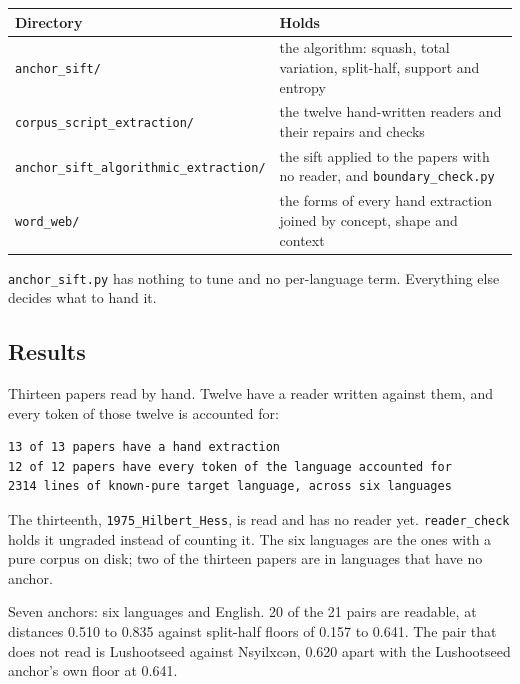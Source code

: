 \tiny
\setlength{\tabcolsep}{2pt}
\begin{longtable}{@{}>{\raggedright\arraybackslash}p{}>{\raggedright\arraybackslash}p{}@{}}
\toprule
Directory & Holds \\
\midrule
\texttt{anchor\_\allowbreak{}sift/\allowbreak{}} & the algorithm: squash, total variation, split-half, support and entropy \\
\texttt{corpus\_\allowbreak{}script\_\allowbreak{}extraction/\allowbreak{}} & the twelve hand-written readers and their repairs and checks \\
\texttt{anchor\_\allowbreak{}sift\_\allowbreak{}algorithmic\_\allowbreak{}extraction/\allowbreak{}} & the sift applied to the papers with no reader, and \texttt{boundary\_\allowbreak{}check.\allowbreak{}py} \\
\texttt{word\_\allowbreak{}web/\allowbreak{}} & the forms of every hand extraction joined by concept, shape and context \\
\bottomrule
\end{longtable}
\normalsize

\texttt{anchor\_\allowbreak{}sift.\allowbreak{}py} has nothing to tune and no per-language term. Everything else decides what to hand it.

\subsection{Results}

Thirteen papers read by hand. Twelve have a reader written against them, and every token of those twelve is accounted for:

\begin{lstlisting}[breaklines=true,breakatwhitespace=false,basicstyle=\ttfamily\small]
13 of 13 papers have a hand extraction
12 of 12 papers have every token of the language accounted for
2314 lines of known-pure target language, across six languages
\end{lstlisting}

The thirteenth, \texttt{1975\_\allowbreak{}Hilbert\_\allowbreak{}Hess}, is read and has no reader yet. \texttt{reader\_\allowbreak{}check} holds it ungraded instead of counting it. The six languages are the ones with a pure corpus on disk; two of the thirteen papers are in languages that have no anchor.

Seven anchors: six languages and English. 20 of the 21 pairs are readable, at distances 0.510 to 0.835 against split-half floors of 0.157 to 0.641. The pair that does not read is Lushootseed against Nsyilxcən, 0.620 apart with the Lushootseed anchor's own floor at 0.641.

